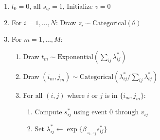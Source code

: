 \documentclass[11pt]{article}
\begin{document}
\begin{enumerate}
\item $t_0 = 0$, all $s_{ij} = 1$, Initialize $v = 0$
\item For $i = 1, \ldots, N$: Draw $z_i \sim \mbox{Categorical}(\theta)$
\item For $m = 1, \ldots, M$:
  \begin{enumerate}
  \item Draw $t_m \sim \mbox{Exponential}\left(\sum_{ij} \lambda_{ij}^*\right)$
  \item Draw $(i_m,j_m) \sim \mbox{Categorical}\left(\lambda_{ij}^* / \sum_{ij}\lambda_{ij}^*\right)$
  \item For all $(i,j)$ where $i$ or $j$ is in $\{i_m,j_m\}$:
    \begin{enumerate}
    \item Compute $s_{ij}^*$ using event $0$ through $v_{ij}$
    \item Set $\lambda_{ij}^* \leftarrow \exp\{ \beta_{z_i,z_j} s_{ij}^*\}$ 
    \end{enumerate}
  \end{enumerate}
\end{enumerate}




\end{document}
